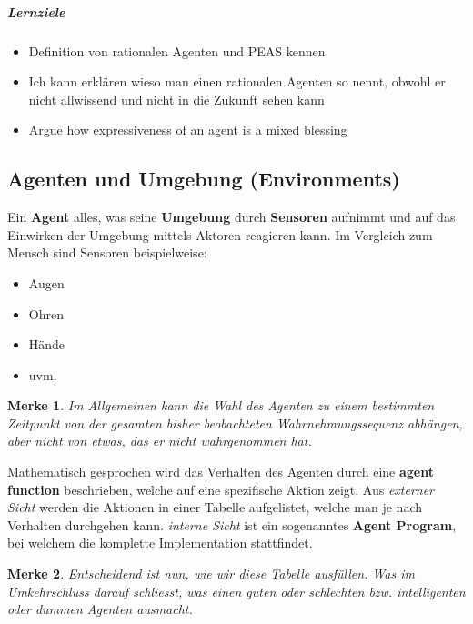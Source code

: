 \documentclass{article}
\theoremstyle{merke}
\newtheorem*{merke}{Merke}
\theoremstyle{definition}
\begin{document}
\subparagraph{Lernziele}
\begin{itemize}
\item Definition von rationalen Agenten und PEAS kennen
\item Ich kann erklären wieso man einen rationalen Agenten so nennt, obwohl er nicht allwissend und nicht in die Zukunft sehen kann
\item Argue how expressiveness of an agent is a mixed blessing
\end{itemize}

\subsection{Agenten und Umgebung (Environments)}
Ein \textbf{Agent} alles, was seine \textbf{Umgebung} durch \textbf{Sensoren} aufnimmt und auf das Einwirken der Umgebung mittels Aktoren reagieren kann. Im Vergleich zum Mensch sind Sensoren beispielweise:
\begin{itemize}
\item Augen
\item Ohren
\item Hände
\item uvm.
\end{itemize}
 
 \begin{merke}
 Im Allgemeinen kann die Wahl des Agenten zu einem bestimmten Zeitpunkt von der gesamten bisher beobachteten Wahrnehmungssequenz abhängen, aber nicht von etwas, das er nicht wahrgenommen hat.
 \end{merke}
 Mathematisch gesprochen wird das Verhalten des Agenten durch eine \textbf{agent function} beschrieben, welche auf eine spezifische Aktion zeigt. Aus \textit{externer Sicht} werden die Aktionen in einer Tabelle aufgelistet, welche man je nach Verhalten durchgehen kann. \textit{interne Sicht} ist ein sogenanntes \textbf{Agent Program}, bei welchem die komplette Implementation stattfindet.
 
\begin{merke}
Entscheidend ist nun, wie wir diese Tabelle ausfüllen. Was im Umkehrschluss darauf schliesst, was einen guten oder schlechten bzw. intelligenten oder dummen Agenten ausmacht.
\end{merke}
\end{document}
